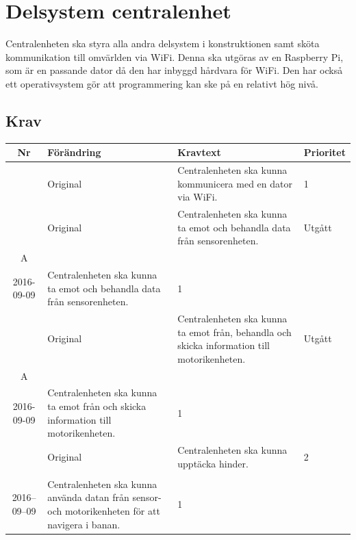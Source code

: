 \documentclass[a4paper,titlepage,12pt]{article}
\newcounter{reqNr}
\newcommand{\nextReqNr}{\stepcounter{reqNr}\arabic{reqNr}}
\newcounter{reqNrII}
\newcommand{\nextReqNrII}{\stepcounter{reqNrII}\arabic{reqNrII}}
\newcommand{\newContent}[1] {\pbox{5cm}{Nytt innehåll i \arabic{reqNr}\\#1}}
\newcommand{\newRequirement}[1] {\pbox{5cm}{Tillagt \\#1}}
\begin{document}
	\section{Delsystem centralenhet}
	Centralenheten ska styra alla andra delsystem i konstruktionen samt sköta
	kommunikation till omvärlden via WiFi. Denna ska utgöras av en Raspberry
	Pi, som är en passande dator då den har inbyggd hårdvara för WiFi. Den har 
	också ett operativsystem gör att programmering kan ske på en relativt hög nivå.

	\newpage

	\subsection{Krav}
	\begin{longtable}[c]{ c l>{\raggedright}p{} l }
		\textbf{Nr} & \textbf{Förändring} & \textbf{Kravtext} & \textbf{Prioritet} 
			\\ \midrule

		\nextReqNr{} & Original & Centralenheten ska kunna kommunicera 
			med en dator via WiFi. & 1
			\\ \midrule

		\nextReqNr{} & Original & Centralenheten ska kunna ta emot och 
			behandla data från sensorenheten.& Utgått
			\\ \hline
		\arabic{reqNr}A & \newContent{2016-09-09} & Centralenheten ska kunna ta emot och 
			behandla data från sensorenheten.& 1
			\\ \midrule

		\nextReqNr{} & Original & Centralenheten ska kunna ta emot från, 
			behandla och skicka information till motorikenheten. & Utgått
			\\ \hline

		\arabic{reqNr}A & \newContent{2016-09-09} & Centralenheten ska kunna ta emot från
			 och skicka information till motorikenheten. & 1
			\\ \midrule

		\nextReqNr{} & Original & Centralenheten ska kunna upptäcka hinder. & 2
		\\ \midrule

		\nextReqNrII{} & \newRequirement{2016--09--09} & Centralenheten ska kunna använda
		datan från sensor- och motorikenheten för att navigera i banan.  & 1
	\end{longtable}
\end{document}
